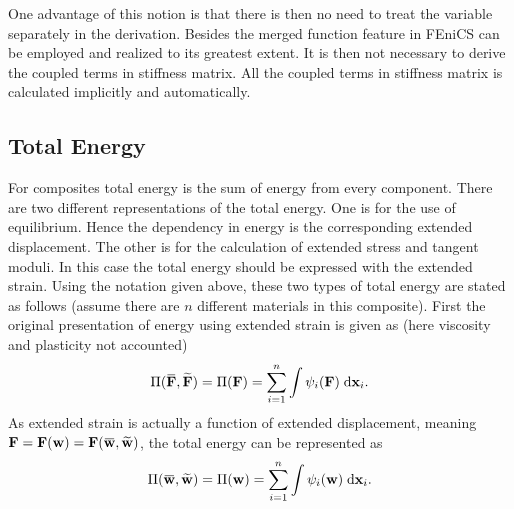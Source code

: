 \documentclass[10pt,a4paper]{scrreprt}
\newcommand{\myd}{\;\mathrm{d}}
\newcommand{\overbar}[1]{\mkern 1.5mu\overline{\mkern-1.5mu#1\mkern-1.5mu}\mkern 1.5mu}
\begin{document}
One advantage of this notion is that there is then no need to treat the variable separately in the derivation. Besides the merged function feature in FEniCS can be employed and realized to its greatest extent. It is then not necessary to derive the coupled terms in stiffness matrix. All the coupled terms in stiffness matrix is calculated implicitly and automatically.

\subsection{Total Energy}
For composites total energy is the sum of energy from every component. There are two different representations of the total energy. One is for the use of equilibrium. Hence the dependency in energy is the corresponding extended displacement. The other is for the calculation of extended stress and tangent moduli. In this case the total energy should be expressed with the extended strain. Using the notation given above, these two types of total energy are stated as follows (assume there are $n$ different materials in this composite). First the original presentation of energy using extended strain is given as (here viscosity and plasticity not accounted) 
\begin{equation}
\label{eq: strain energy}
\Pi(\overbar{\mathbf{F}}, \widetilde{\mathbf{F}}) = \Pi(\mathbf{F}) = \sum^{n}_{i=1} \int \psi_{i}(\mathbf{F}) \myd{\mathbf{x}_{i}}.
\end{equation}
As extended strain is actually a function of extended displacement, meaning $\mathbf{F}=\mathbf{F}(\mathbf{w})=\mathbf{F}(\overbar{\mathbf{w}}, \widetilde{\mathbf{w}})$, the total energy can be represented as
\begin{equation}
\label{eq: disp energy}
\Pi(\overbar{\mathbf{w}}, \widetilde{\mathbf{w}}) = \Pi(\mathbf{w}) = \sum^{n}_{i=1} \int \psi_{i}(\mathbf{w}) \myd{\mathbf{x}_{i}}.
\end{equation} 
\end{document}

